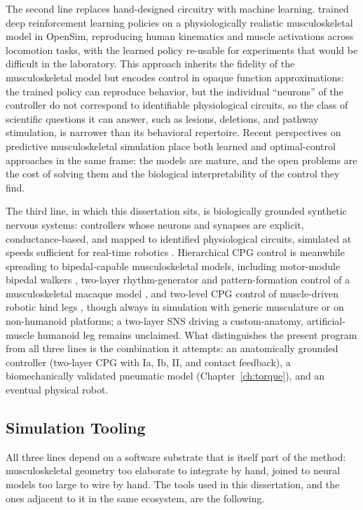The second line replaces hand-designed circuitry with machine learning. \citet{song_deep_2021} trained deep reinforcement learning policies on a physiologically realistic musculoskeletal model in OpenSim, reproducing human kinematics and muscle activations across locomotion tasks, with the learned policy re-usable for experiments that would be difficult in the laboratory. This approach inherits the fidelity of the musculoskeletal model but encodes control in opaque function approximations: the trained policy can reproduce behavior, but the individual ``neurons'' of the controller do not correspond to identifiable physiological circuits, so the class of scientific questions it can answer, such as lesions, deletions, and pathway stimulation, is narrower than its behavioral repertoire. Recent perspectives on predictive musculoskeletal simulation \citep{degroote_perspective_2021} place both learned and optimal-control approaches in the same frame: the models are mature, and the open problems are the cost of solving them and the biological interpretability of the control they find.

The third line, in which this dissertation sits, is biologically grounded synthetic nervous systems: controllers whose neurons and synapses are explicit, conductance-based, and mapped to identified physiological circuits, simulated at speeds sufficient for real-time robotics \citep{nourse_sns_2023}. Hierarchical CPG control is meanwhile spreading to bipedal-capable musculoskeletal models, including motor-module bipedal walkers \citep{ichimura_pathological_2019}, two-layer rhythm-generator and pattern-formation control of a musculoskeletal macaque model \citep{nishizaki_gait_2026}, and two-level CPG control of muscle-driven robotic hind legs \citep{fukuoka_autonomous_2021}, though always in simulation with generic musculature or on non-humanoid platforms; a two-layer SNS driving a custom-anatomy, artificial-muscle humanoid leg remains unclaimed. What distinguishes the present program from all three lines is the combination it attempts: an anatomically grounded controller (two-layer CPG with Ia, Ib, II, and contact feedback), a biomechanically validated pneumatic model (Chapter~\ref{ch:torque}), and an eventual physical robot.

\subsection{Simulation Tooling}\label{sec:bg_tools}

All three lines depend on a software substrate that is itself part of the method: musculoskeletal geometry too elaborate to integrate by hand, joined to neural models too large to wire by hand. The tools used in this dissertation, and the ones adjacent to it in the same ecosystem, are the following.

